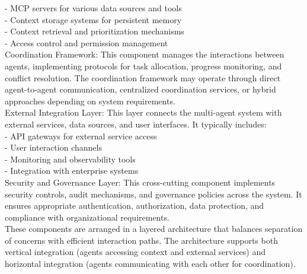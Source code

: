 - MCP servers for various data sources and tools\\ \newline
- Context storage systems for persistent memory\\ \newline
- Context retrieval and prioritization mechanisms\\ \newline
- Access control and permission management\\ \newline
Coordination Framework: This component manages the interactions between agents, implementing protocols for task allocation, progress monitoring, and conflict resolution. The coordination framework may operate through direct agent-to-agent communication, centralized coordination services, or hybrid approaches depending on system requirements.\\ \newline
External Integration Layer: This layer connects the multi-agent system with external services, data sources, and user interfaces. It typically includes:\\ \newline
- API gateways for external service access\\ \newline
- User interaction channels\\ \newline
- Monitoring and observability tools\\ \newline
- Integration with enterprise systems\\ \newline
Security and Governance Layer: This cross-cutting component implements security controls, audit mechanisms, and governance policies across the system. It ensures appropriate authentication, authorization, data protection, and compliance with organizational requirements.\\ \newline
These components are arranged in a layered architecture that balances separation of concerns with efficient interaction paths. The architecture supports both vertical integration (agents accessing context and external services) and horizontal integration (agents communicating with each other for coordination).\\
